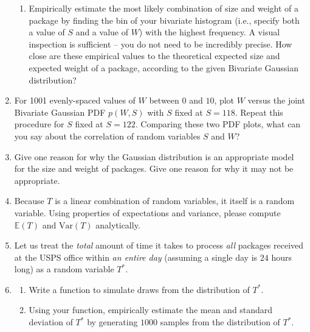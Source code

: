 \documentclass{harvardml}
\theoremstyle{definition}
\theoremstyle{plain}
\begin{document}
\begin{problem}
\begin{enumerate}
\begin{enumerate}
        \item Empirically estimate the most likely combination of size and weight of a package by finding the bin of your bivariate histogram (i.e., specify both a value of $S$ and a value of $W$) with the highest frequency. A visual inspection is sufficient -- you do not need to be incredibly precise.  How close are these empirical values to the theoretical expected size and expected weight of a package, according to the given Bivariate Gaussian distribution?
    \end{enumerate}
    \item For 1001 evenly-spaced values of $W$ between $0$ and $10$, plot $W$ versus the joint Bivariate Gaussian PDF $p(W, S)$ with $S$ fixed at $S=118$. Repeat this procedure for $S$ fixed at $S=122$. Comparing these two PDF plots, what can you say about the correlation of random variables $S$ and $W$?
    \item Give one reason for why the Gaussian distribution is an appropriate model for the size and weight of packages. Give one reason for why it may not be appropriate.
    \item Because $T$ is a linear combination of random variables, it itself is a random variable. Using properties of expectations and variance, please compute $\mathbb{E}(T)$ and $\mathrm{Var}(T)$ analytically.
    \item Let us treat the \textit{total} amount of time it takes to process \textit{all} packages received at the USPS office within \textit{an entire day} (assuming a single day is $24$ hours long) as a random variable $T^{*}$. 
    \item
    \begin{enumerate}
        \item Write a function to simulate draws from the distribution of $T^{*}$. 
        \item Using your function, empirically estimate the mean and standard deviation of $T^{*}$ by generating $1000$ samples from the distribution of $T^{*}$.
    \end{enumerate}
\end{enumerate}
\end{problem}
\newpage
\end{document}
